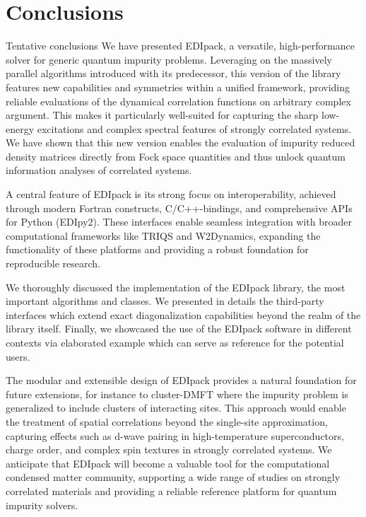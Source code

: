 \documentclass[preprint,3p,10pt]{elsarticle}
\def\NAME{{\rm EDIpack}\xspace}
\begin{document}
\section{Conclusions}
{\color{red} Tentative conclusions}
We have presented \NAME{}, a versatile, high-performance solver for
generic quantum impurity problems. Leveraging on the massively
parallel algorithms introduced with its predecessor, this version of
the library features new capabilities and symmetries within a unified
framework, providing reliable evaluations of the dynamical correlation
functions on arbitrary complex argument.
This makes it particularly well-suited for capturing the sharp
low-energy excitations and complex spectral features of strongly
correlated systems. We have shown that this new version enables the evaluation of impurity
reduced density matrices directly from Fock space quantities and thus unlock 
quantum information analyses of correlated systems.  

A central feature of \NAME is its strong focus on interoperability,
achieved through modern Fortran constructs, C/C++-bindings, and
comprehensive APIs for Python (EDIpy2). 
These interfaces enable seamless integration with broader
computational frameworks like TRIQS and W2Dynamics, expanding the
functionality of these platforms and providing a robust foundation for
reproducible research.

We thoroughly discussed the implementation of the \NAME library, the
most important algorithms and classes. We presented in
details the third-party interfaces which extend exact diagonalization
capabilities beyond the realm of the library itself.   
Finally, we showcased the use of the \NAME software in different
contexts via elaborated example which can serve as reference for the
potential users. 

The modular and extensible design of \NAME provides a
natural foundation for future extensions, for instance to cluster-DMFT where the
impurity problem is generalized to include clusters of interacting
sites. This approach would enable the treatment of spatial
correlations beyond the single-site approximation, capturing effects
such as d-wave pairing in high-temperature superconductors, charge
order, and complex spin textures in strongly correlated systems.
We anticipate that \NAME will become a valuable tool for the
computational condensed matter community, supporting a wide range of
studies on strongly correlated materials and providing a reliable
reference platform for quantum impurity solvers.
\end{document}
